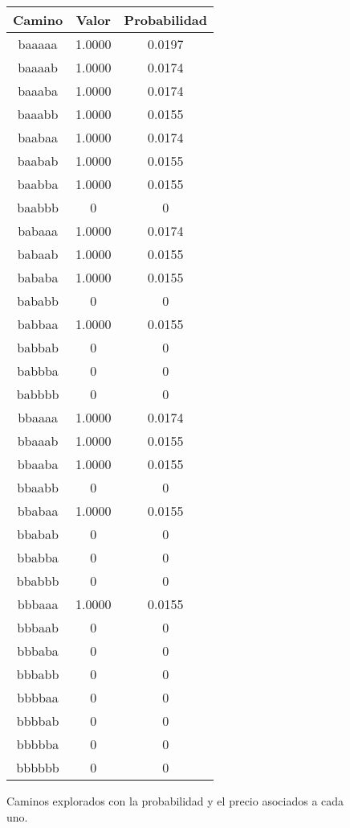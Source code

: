\begin{figure}[hbpt]
\begin{minipage}{0.48\textwidth}
\begin{center}
\begin{tabular}{|c|c|c|}
\hline
\end{tabular}
\end{center}
\end{minipage}
\begin{minipage}{0.48\textwidth}
\begin{center}
\begin{tabular}{|c|c|c|}
\hline
\textbf{Camino} & \textbf{Valor} & \textbf{Probabilidad} \\
\hline
baaaaa  &  1.0000  &  0.0197  \\
baaaab  &  1.0000  &  0.0174  \\
baaaba  &  1.0000  &  0.0174  \\
baaabb  &  1.0000  &  0.0155  \\
baabaa  &  1.0000  &  0.0174  \\
baabab  &  1.0000  &  0.0155  \\
baabba  &  1.0000  &  0.0155  \\
baabbb  & 0 & 0 \\
babaaa  &  1.0000  &  0.0174  \\
babaab  &  1.0000  &  0.0155  \\
bababa  &  1.0000  &  0.0155  \\
bababb  & 0 & 0 \\
babbaa  &  1.0000  &  0.0155  \\
babbab  & 0 & 0 \\
babbba  & 0 & 0 \\
babbbb  & 0 & 0 \\
bbaaaa  &  1.0000  &  0.0174  \\
bbaaab  &  1.0000  &  0.0155  \\
bbaaba  &  1.0000  &  0.0155  \\
bbaabb  & 0 & 0 \\
bbabaa  &  1.0000  &  0.0155  \\
bbabab  & 0 & 0 \\
bbabba  & 0 & 0 \\
bbabbb  & 0 & 0 \\
bbbaaa  &  1.0000  &  0.0155  \\
bbbaab  & 0 & 0 \\
bbbaba  & 0 & 0 \\
bbbabb  & 0 & 0 \\
bbbbaa  & 0 & 0 \\
bbbbab  & 0 & 0 \\
bbbbba  & 0 & 0 \\
bbbbbb  & 0 & 0 \\
\hline
\end{tabular}
\end{center}
\end{minipage}
\caption{Caminos explorados con la probabilidad y el precio asociados a cada uno.}
\label{fig:2_4a}
\end{figure}

